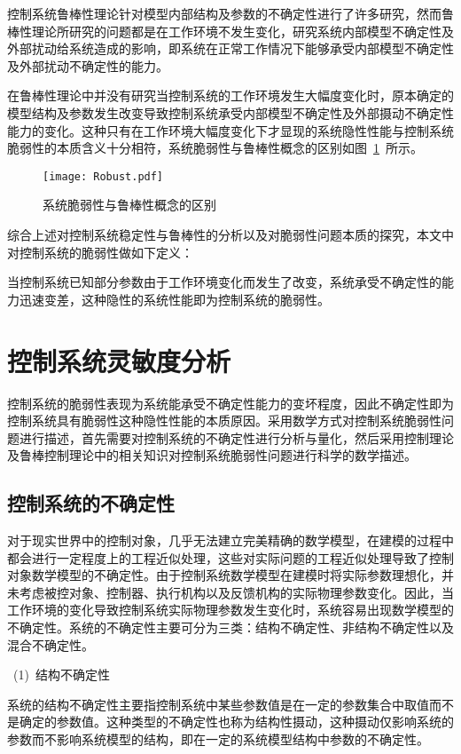 控制系统鲁棒性理论针对模型内部结构及参数的不确定性进行了许多研究，然而鲁棒性理论所研究的问题都是在工作环境不发生变化，研究系统内部模型不确定性及外部扰动给系统造成的影响，即系统在正常工作情况下能够承受内部模型不确定性及外部扰动不确定性的能力。

在鲁棒性理论中并没有研究当控制系统的工作环境发生大幅度变化时，原本确定的模型结构及参数发生改变导致控制系统承受内部模型不确定性及外部摄动不确定性能力的变化。这种只有在工作环境大幅度变化下才显现的系统隐性性能与控制系统脆弱性的本质含义十分相符，系统脆弱性与鲁棒性概念的区别如图~\ref{fig:chap2:robust}~所示。
\begin{figure}[h]
  \centering
     \texttt{[image: Robust.pdf]}\\
   \caption{系统脆弱性与鲁棒性概念的区别}\label{fig:chap2:robust}
\end{figure}

综合上述对控制系统稳定性与鲁棒性的分析以及对脆弱性问题本质的探究，本文中对控制系统的脆弱性做如下定义：

当控制系统已知部分参数由于工作环境变化而发生了改变，系统承受不确定性的能力迅速变差，这种隐性的系统性能即为控制系统的脆弱性。

\section{控制系统灵敏度分析}
\label{sec:chap3:ControlSystem_Sensitivity}
控制系统的脆弱性表现为系统能承受不确定性能力的变坏程度，因此不确定性即为控制系统具有脆弱性这种隐性性能的本质原因。采用数学方式对控制系统脆弱性问题进行描述，首先需要对控制系统的不确定性进行分析与量化，然后采用控制理论及鲁棒控制理论中的相关知识对控制系统脆弱性问题进行科学的数学描述。
\subsection{控制系统的不确定性}
对于现实世界中的控制对象，几乎无法建立完美精确的数学模型，在建模的过程中都会进行一定程度上的工程近似处理，这些对实际问题的工程近似处理导致了控制对象数学模型的不确定性。由于控制系统数学模型在建模时将实际参数理想化，并未考虑被控对象、控制器、执行机构以及反馈机构的实际物理参数变化。因此，当工作环境的变化导致控制系统实际物理参数发生变化时，系统容易出现数学模型的不确定性。系统的不确定性主要可分为三类：结构不确定性、非结构不确定性以及混合不确定性。

~(1)~结构不确定性

系统的结构不确定性主要指控制系统中某些参数值是在一定的参数集合中取值而不是确定的参数值。这种类型的不确定性也称为结构性摄动，这种摄动仅影响系统的参数而不影响系统模型的结构，即在一定的系统模型结构中参数的不确定性。

